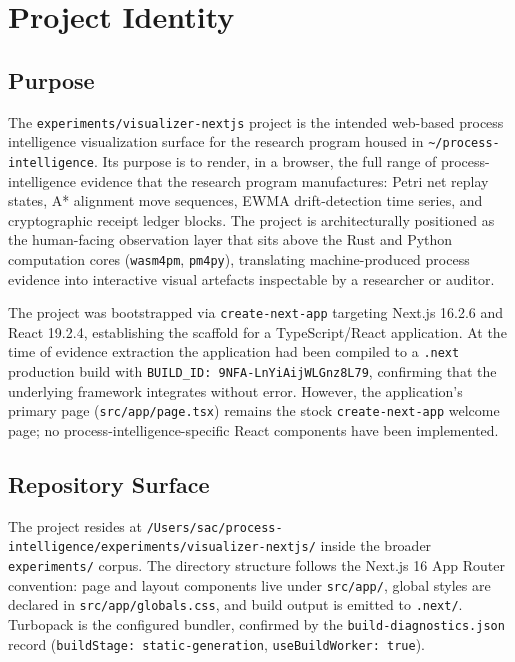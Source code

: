 
\section{Project Identity}
\label{sec:experiments-visualizer-nextjs-identity}

\subsection{Purpose}
\label{sec:experiments-visualizer-nextjs-identity-purpose}

The \texttt{experiments/visualizer-nextjs} project is the intended web-based process intelligence
visualization surface for the research program housed in \texttt{{\textasciitilde}/process-intelligence}.
Its purpose is to render, in a browser, the full range of process-intelligence evidence that the
research program manufactures: Petri net replay states, A{*} alignment move sequences, EWMA
drift-detection time series, and cryptographic receipt ledger blocks. The project is architecturally
positioned as the human-facing observation layer that sits above the Rust and Python computation
cores (\texttt{wasm4pm}, \texttt{pm4py}), translating machine-produced process evidence into
interactive visual artefacts inspectable by a researcher or auditor.

The project was bootstrapped via \texttt{create-next-app} targeting Next.js 16.2.6 and React 19.2.4,
establishing the scaffold for a TypeScript/React application. At the time of evidence extraction
the application had been compiled to a \texttt{.next} production build with
\texttt{BUILD\_ID: 9NFA-LnYiAijWLGnz8L79}, confirming that the underlying framework integrates
without error. However, the application's primary page (\texttt{src/app/page.tsx}) remains the
stock \texttt{create-next-app} welcome page; no process-intelligence-specific React components
have been implemented.

\subsection{Repository Surface}
\label{sec:experiments-visualizer-nextjs-identity-surface}

The project resides at \texttt{/Users/sac/process-intelligence/experiments/visualizer-nextjs/}
inside the broader \texttt{experiments/} corpus. The directory structure follows the Next.js 16
App Router convention: page and layout components live under \texttt{src/app/}, global styles
are declared in \texttt{src/app/globals.css}, and build output is emitted to \texttt{.next/}.
Turbopack is the configured bundler, confirmed by the \texttt{build-diagnostics.json} record
(\texttt{buildStage: static-generation}, \texttt{useBuildWorker: true}).

